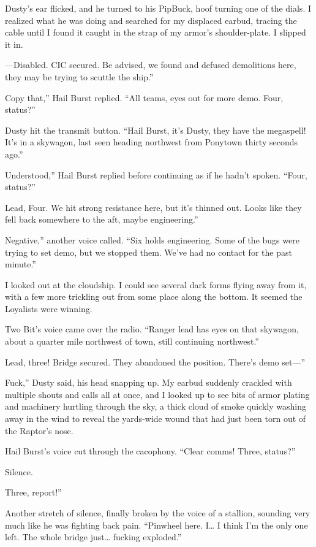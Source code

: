 Dusty’s ear flicked, and he turned to his PipBuck, hoof turning one of the dials. I realized what he was doing and searched for my displaced earbud, tracing the cable until I found it caught in the strap of my armor’s shoulder-plate. I slipped it in.

\leavevmode{}—Disabled. CIC secured. Be advised, we found and defused demolitions here, they may be trying to scuttle the ship.”

\leavevmode{}Copy that,” Hail Burst replied. “All teams, eyes out for more demo. Four, status?”

Dusty hit the transmit button. “Hail Burst, it’s Dusty, they have the megaspell! It’s in a skywagon, last seen heading northwest from Ponytown thirty seconds ago.”

\leavevmode{}Understood,” Hail Burst replied before continuing as if he hadn’t spoken. “Four, status?”

\leavevmode{}Lead, Four. We hit strong resistance here, but it’s thinned out. Looks like they fell back somewhere to the aft, maybe engineering.”

\leavevmode{}Negative,” another voice called. “Six holds engineering. Some of the bugs were trying to set demo, but we stopped them. We’ve had no contact for the past minute.”

I looked out at the cloudship. I could see several dark forms flying away from it, with a few more trickling out from some place along the bottom. It seemed the Loyalists were winning.

Two Bit’s voice came over the radio. “Ranger lead has eyes on that skywagon, about a quarter mile northwest of town, still continuing northwest.”

\leavevmode{}Lead, three! Bridge secured. They abandoned the position. There’s demo set—”

\leavevmode{}Fuck,” Dusty said, his head snapping up. My earbud suddenly crackled with multiple shouts and calls all at once, and I looked up to see bits of armor plating and machinery hurtling through the sky, a thick cloud of smoke quickly washing away in the wind to reveal the yards-wide wound that had just been torn out of the Raptor’s nose.

Hail Burst’s voice cut through the cacophony. “Clear comms! Three, status?”

Silence.

\leavevmode{}Three, report!”

Another stretch of silence, finally broken by the voice of a stallion, sounding very much like he was fighting back pain. “Pinwheel here. I… I think I’m the only one left. The whole bridge just… fucking exploded.”


